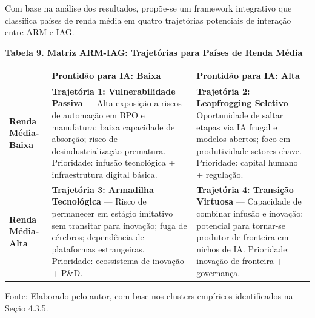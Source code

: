 \documentclass[
  brazilian,
  12pt,
]{article}
\newcounter{none} %
\begin{document}
Com base na análise dos resultados, propõe-se um framework integrativo que classifica países de renda média em quatro trajetórias potenciais de interação entre ARM e IAG.

\textbf{Tabela 9. Matriz ARM-IAG: Trajetórias para Países de Renda Média}

{\def\LTcaptype{none} %
\begin{longtable}[]{@{}
  >{\raggedright\arraybackslash}p{}
  >{\raggedright\arraybackslash}p{}
  >{\raggedright\arraybackslash}p{}@{}}
\toprule\noalign{}
\begin{minipage}[b]{\linewidth}\raggedright
\end{minipage} & \begin{minipage}[b]{\linewidth}\raggedright
Prontidão para IA: Baixa
\end{minipage} & \begin{minipage}[b]{\linewidth}\raggedright
Prontidão para IA: Alta
\end{minipage} \\
\midrule\noalign{}
\endhead
\bottomrule\noalign{}
\endlastfoot
\textbf{Renda Média-Baixa} & \textbf{Trajetória 1: Vulnerabilidade Passiva} --- Alta exposição a riscos de automação em BPO e manufatura; baixa capacidade de absorção; risco de desindustrialização prematura. Prioridade: infusão tecnológica + infraestrutura digital básica. & \textbf{Trajetória 2: Leapfrogging Seletivo} --- Oportunidade de saltar etapas via IA frugal e modelos abertos; foco em produtividade setores-chave. Prioridade: capital humano + regulação. \\
\textbf{Renda Média-Alta} & \textbf{Trajetória 3: Armadilha Tecnológica} --- Risco de permanecer em estágio imitativo sem transitar para inovação; fuga de cérebros; dependência de plataformas estrangeiras. Prioridade: ecossistema de inovação + P\&D. & \textbf{Trajetória 4: Transição Virtuosa} --- Capacidade de combinar infusão e inovação; potencial para tornar-se produtor de fronteira em nichos de IA. Prioridade: inovação de fronteira + governança. \\
\end{longtable}
}

Fonte: Elaborado pelo autor, com base nos clusters empíricos identificados na Seção 4.3.5.
\end{document}
